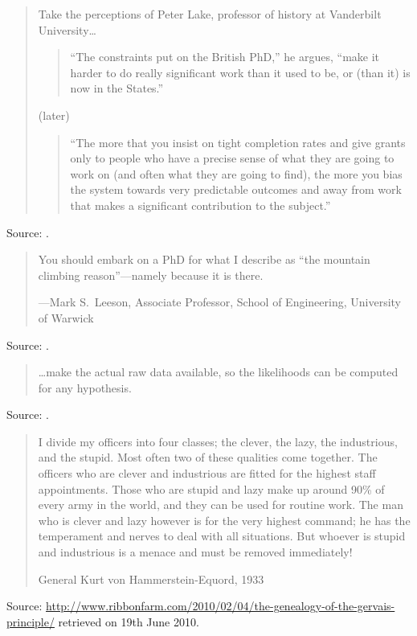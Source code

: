 \documentclass[a4paper]{article}
\begin{document}
\begin{quote}
	Take the perceptions of Peter Lake, professor of history at
	Vanderbilt University\ldots
	
	\begin{quotation}
		``The constraints put on the British PhD,'' he argues,
		``make it harder to do really significant work than it
		used to be, or (than it) is now in the States.''
	\end{quotation}
	(later)
	\begin{quotation}
		``The more that you insist on tight completion rates
		and give grants only to people who have a precise sense
		of what they are going to work on (and often what they
		are going to find), the more you bias the system towards
		very predictable outcomes and away from work that makes
		a significant contribution to the subject.''
	\end{quotation}
\end{quote}
Source: \citet{Reisz2008}.
\medskip

\begin{quote}
	You should embark on a PhD for what I describe as ``the mountain
	climbing reason''---namely because it is there.

	---Mark S.~Leeson, Associate Professor, School of Engineering,
	University of Warwick
\end{quote}
Source: \citet{Baty2009}.
\medskip

\begin{quote}
	\ldots make the actual raw data available, so the likelihoods
	can be computed for any hypothesis.
\end{quote}
Source: \citet{Hutton2010}.
\medskip

\begin{quote}
	I divide my officers into four classes; the clever, the lazy, the
	industrious, and the stupid. Most often two of these qualities
	come together. The officers who are clever and industrious are
	fitted for the highest staff appointments. Those who are stupid
	and lazy make up around 90\% of every army in the world, and they
	can be used for routine work. The man who is clever and lazy
	however is for the very highest command; he has the temperament
	and nerves to deal with all situations. But whoever is stupid
	and industrious is a menace and must be removed immediately!

	General Kurt von Hammerstein-Equord, 1933
\end{quote}
Source: \url{http://www.ribbonfarm.com/2010/02/04/the-genealogy-of-the-gervais-principle/} retrieved on 19th June 2010.
\medskip
\end{document}
